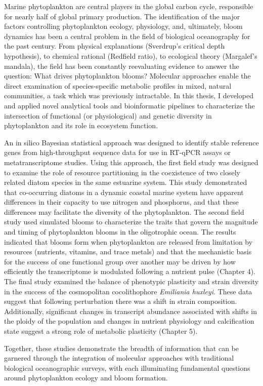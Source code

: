 % 
% 
%
Marine phytoplankton are central players in the global carbon cycle, responsible for nearly half of global primary production. The identification of the major factors controlling phytoplankton ecology, physiology, and, ultimately, bloom dynamics has been a central problem in the field of biological oceanography for the past century. From physical explanations (Sverdrup's critical depth hypothesis), to chemical rational (Redfield ratio), to ecological theory (Margalef's mandala), the field has been constantly reevaluating evidence to answer the question: What drives phytoplankton blooms? Molecular approaches enable the direct examination of species-specific metabolic profiles in mixed, natural communities, a task which was previously intractable. In this thesis, I developed and applied novel analytical tools and bioinformatic pipelines to characterize the intersection of functional (or physiological) and genetic diversity in phytoplankton and its role in ecosystem function.  \par
An in silico Bayesian statistical approach was designed to identify stable reference genes from high-throughput sequence data for use in RT-qPCR assays or metatranscriptome studies. Using this approach, the first field study was designed to examine the role of resource partitioning in the coexistence of two closely related diatom species in the same estuarine system. This study demonstrated that co-occurring diatoms in a dynamic coastal marine system have apparent differences in their capacity to use nitrogen and phosphorus, and that these differences may facilitate the diversity of the phytoplankton. The second field study used simulated blooms to characterize the traits that govern the magnitude and timing of phytoplankton blooms in the oligotrophic ocean. The results indicated that blooms form when phytoplankton are released from limitation by resources (nutrients, vitamins, and trace metals) and that the mechanistic basis for the success of one functional group over another may be driven by how efficiently the transcriptome is modulated following a nutrient pulse (Chapter 4). The final study examined the balance of phenotypic plasticity and strain diversity in the success of the cosmopolitan cocolithophore \textit{Emiliania huxleyi}. These data suggest that following perturbation there was a shift in strain composition. Additionally, significant changes in transcript abundance associated with shifts in the ploidy of the population and changes in nutrient physiology and calcification state suggest a strong role of metabolic plasticity (Chapter 5). \par
Together, these studies demonstrate the breadth of information that can be garnered through the integration of molecular approaches with traditional biological oceanographic surveys, with each illuminating fundamental questions around phytoplankton ecology and bloom formation.



